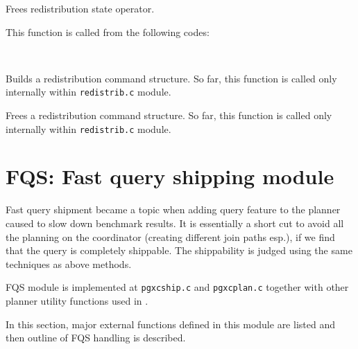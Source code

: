   
      Frees redistribution state operator.
      
      This function is called from the following codes:
      
      \FuncRefHdr
		  \\ \hline
      \FuncRefTrailor
  
  
      Builds a redistribution command structure.
      So far, this function is called only internally within
      \texttt{redistrib.c} module.
  
  
      Frees a redistribution command structure.
      So far, this function is called only internally within
      \texttt{redistrib.c} module.



\section{\label{sec:FQS}FQS: Fast query shipping module}

  Fast query shipment became a topic when adding \XC{} query feature to
  the planner caused to slow down benchmark results.
  It is essentially a short cut to avoid all the planning on the
  coordinator (creating different join paths esp.),
  if we find that the query is completely shippable.
  The shippability is judged using the same techniques as above methods.
  
  FQS module is implemented at
  \texttt{pgxcship.c} and
  \texttt{pgxcplan.c} together with other planner utility functions
  used in \XC.
  
  In this section, major external functions defined in this module are listed and then
  outline of FQS handling is described.



